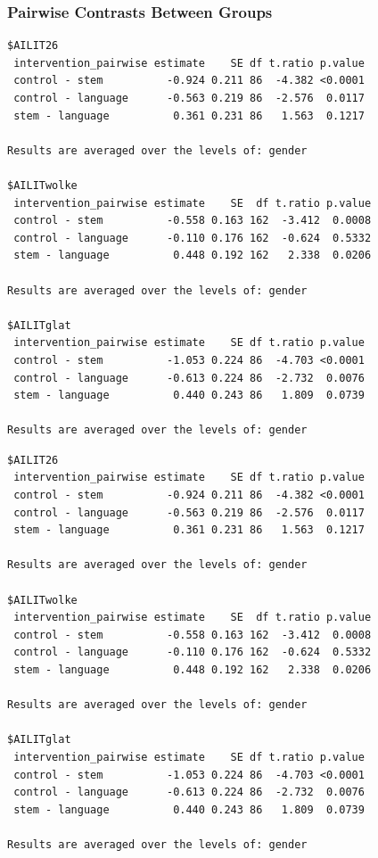 \documentclass[
  letterpaper,
  DIV=11,
  numbers=noendperiod]{scrartcl}
\begin{document}
\subsubsection{Pairwise Contrasts Between
Groups}\label{pairwise-contrasts-between-groups}

\begin{verbatim}
$AILIT26
 intervention_pairwise estimate    SE df t.ratio p.value
 control - stem          -0.924 0.211 86  -4.382 <0.0001
 control - language      -0.563 0.219 86  -2.576  0.0117
 stem - language          0.361 0.231 86   1.563  0.1217

Results are averaged over the levels of: gender 

$AILITwolke
 intervention_pairwise estimate    SE  df t.ratio p.value
 control - stem          -0.558 0.163 162  -3.412  0.0008
 control - language      -0.110 0.176 162  -0.624  0.5332
 stem - language          0.448 0.192 162   2.338  0.0206

Results are averaged over the levels of: gender 

$AILITglat
 intervention_pairwise estimate    SE df t.ratio p.value
 control - stem          -1.053 0.224 86  -4.703 <0.0001
 control - language      -0.613 0.224 86  -2.732  0.0076
 stem - language          0.440 0.243 86   1.809  0.0739

Results are averaged over the levels of: gender 
\end{verbatim}

\begin{verbatim}
$AILIT26
 intervention_pairwise estimate    SE df t.ratio p.value
 control - stem          -0.924 0.211 86  -4.382 <0.0001
 control - language      -0.563 0.219 86  -2.576  0.0117
 stem - language          0.361 0.231 86   1.563  0.1217

Results are averaged over the levels of: gender 

$AILITwolke
 intervention_pairwise estimate    SE  df t.ratio p.value
 control - stem          -0.558 0.163 162  -3.412  0.0008
 control - language      -0.110 0.176 162  -0.624  0.5332
 stem - language          0.448 0.192 162   2.338  0.0206

Results are averaged over the levels of: gender 

$AILITglat
 intervention_pairwise estimate    SE df t.ratio p.value
 control - stem          -1.053 0.224 86  -4.703 <0.0001
 control - language      -0.613 0.224 86  -2.732  0.0076
 stem - language          0.440 0.243 86   1.809  0.0739

Results are averaged over the levels of: gender 
\end{verbatim}
\end{document}
